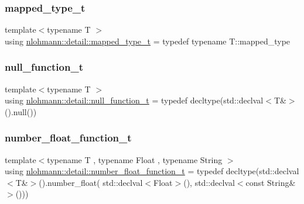 \mbox{\label{namespacenlohmann_1_1detail_a9c1795c148875722f8482d39e0eb9364}} 
\subsubsection{\texorpdfstring{mapped\+\_\+type\+\_\+t}{mapped\_type\_t}}
{\footnotesize\ttfamily template$<$typename T $>$ \\
using \hyperlink{namespacenlohmann_1_1detail_a9c1795c148875722f8482d39e0eb9364}{nlohmann\+::detail\+::mapped\+\_\+type\+\_\+t} = typedef typename T\+::mapped\+\_\+type}

\mbox{\label{namespacenlohmann_1_1detail_ac1b4e524746bf8b790b2b776048b93c4}} 
\subsubsection{\texorpdfstring{null\+\_\+function\+\_\+t}{null\_function\_t}}
{\footnotesize\ttfamily template$<$typename T $>$ \\
using \hyperlink{namespacenlohmann_1_1detail_ac1b4e524746bf8b790b2b776048b93c4}{nlohmann\+::detail\+::null\+\_\+function\+\_\+t} = typedef decltype(std\+::declval$<$T\&$>$().null())}

\mbox{\label{namespacenlohmann_1_1detail_ad42df56e913abe26ed556e0e92f386f4}} 
\subsubsection{\texorpdfstring{number\+\_\+float\+\_\+function\+\_\+t}{number\_float\_function\_t}}
{\footnotesize\ttfamily template$<$typename T , typename Float , typename String $>$ \\
using \hyperlink{namespacenlohmann_1_1detail_ad42df56e913abe26ed556e0e92f386f4}{nlohmann\+::detail\+::number\+\_\+float\+\_\+function\+\_\+t} = typedef decltype(std\+::declval$<$T\&$>$().number\+\_\+float( std\+::declval$<$Float$>$(), std\+::declval$<$const String\&$>$()))}

